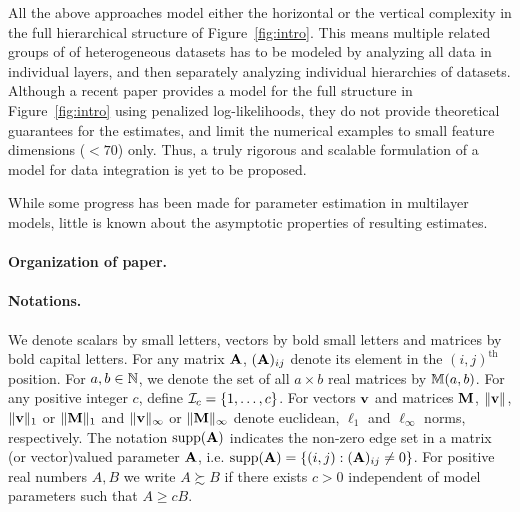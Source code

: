 \vspace{1em}
All the above approaches model either the horizontal or the vertical complexity in the full hierarchical structure of Figure~\ref{fig:intro}. This means multiple related groups of of heterogeneous datasets has to be modeled by analyzing all data in individual layers, and then separately analyzing individual hierarchies of datasets. Although a recent paper \citep{ZhangOuyangZhao17} provides a model for the full structure in Figure~\ref{fig:intro} using penalized log-likelihoods, they do not provide theoretical guarantees for the estimates, and limit the numerical examples to small feature dimensions ($<70$) only. Thus, a truly rigorous and scalable formulation of a model for data integration is yet to be proposed.

While some progress has been made for parameter estimation in multilayer models, little is known about the asymptotic properties of resulting estimates.



\paragraph{Organization of paper.}

\paragraph{Notations.}
We denote scalars by small letters, vectors by bold small letters and matrices by bold capital letters. For any matrix ${\mathbf{A}}$, $({\mathbf{A}})_{ij}$ denote its element in the $(i,j)^\text{th}$ position. For $a,b \in {\mathbb{N}}$, we denote the set of all $a \times b$ real matrices by ${\mathbb{M}}(a,b)$. For any positive integer $c$, define ${\cal{I}}_c = \{ 1, \ldots, c\}$. For vectors ${\bf{v}}$ and matrices ${\mathbf{M}}$, $\| {\bf{v}} \|$, $\|{\bf{v}} \|_1$ or $\|{\mathbf{M}} \|_1$ and $\|{\bf{v}} \|_\infty$ or $\|{\mathbf{M}} \|_\infty$ denote euclidean, $\ell_1$ and $\ell_\infty$ norms, respectively. The notation $\operatorname*{supp}({\mathbf{A}})$ indicates the non-zero edge set in a matrix (or vector)valued parameter ${\mathbf{A}}$, i.e. $\operatorname*{supp}({\mathbf{A}}) = \{(i,j): ({\mathbf{A}})_{ij} \neq 0\}$. For positive real numbers $A, B$ we write $A \succsim B$ if there exists $c>0$ independent of model parameters such that $A \geq cB$. 